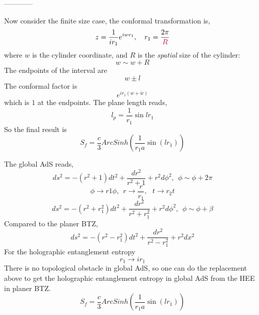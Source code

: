 \documentclass[11pt,a4paper,utf8]{article}
\begin{document}
	------------
	
	Now consider the finite size case, the conformal transformation is,
	\begin{equation}
	z=\frac{1}{ir_1}e^{iwr_1},\quad
		r_1 = \frac{2\pi}{\textcolor{purple}{R}}
	\end{equation}
	where $w$ is the cylinder coordinate, and $R$ is the \textit{spatial} size of the cylinder:
	\begin{equation}
	w\sim w+ R
	\end{equation}
	The endpoints of the interval are 
	\begin{equation}
	w\pm l
	\end{equation}
	The conformal factor is
	\begin{equation}
	e^{ir_1(w+\bar{w})}
	\end{equation}
	which is $1$ at the endpoints. The plane length reads,
	\begin{equation}
	l_p=\frac{1}{r_1}\sin lr_1
	\end{equation}
	So the final result is
	\begin{equation}
	S_f=\frac{c}{3}ArcSinh(\frac{1}{r_1a}\sin(lr_1))
	\end{equation}
	
\pagebreak
	
	The global AdS reads,
	\begin{equation}
	 ds^2=-(r^2+1)dt^2+\frac{dr^2}{r^2+1}+r^2d\phi^2,\ \ \phi\sim\phi+2\pi
	\end{equation}
	\begin{equation}
	\phi\rightarrow r1\phi,\ \ r\rightarrow \frac{r}{r_1}, \ \ \ t\rightarrow r_2 t
	\end{equation}
	\begin{equation}
	 ds^2=-(r^2+r_1^2)dt^2+\frac{dr^2}{r^2+r_1^2}+r^2d\phi^2,\ \ \phi\sim\phi+\beta
	\end{equation}
	Compared to the planer BTZ,
	\begin{equation}
	ds^2=-(r^2-r_1^2)dt^2+\frac{dr^2}{r^2-r_1^2}+r^2dx^2
	\end{equation}
	For the holographic entanglement entropy
	\begin{equation}
	r_1\rightarrow ir_1
	\end{equation}
	There is no topological obstacle in global AdS, so one can do the replacement above to get the holographic entanglement entropy in global AdS from the HEE in planer BTZ.
	\begin{equation}
	S_f=\frac{c}{3}ArcSinh(\frac{1}{r_1a}\sin(lr_1))
	\end{equation}
	
\end{document}
